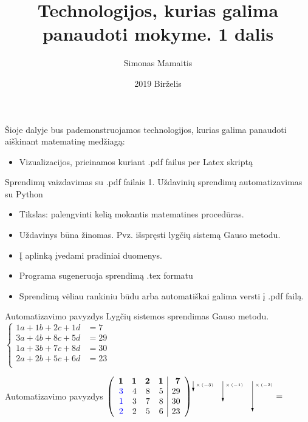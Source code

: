 \documentclass{beamer}
\title{Technologijos, kurias galima panaudoti mokyme. 1 dalis}
\author{Simonas Mamaitis}
\institute[VU]
{VU\\
}
\date{2019 Birželis}
\begin{document}
\begin{frame}
  \titlepage
\end{frame}

\begin{frame}
Šioje dalyje bus pademonstruojamos technologijos, kurias galima panaudoti aiškinant matematinę medžiagą:
\begin{itemize}
\item Vizualizacijos, prieinamos kuriant .pdf failus per Latex skriptą
\end{itemize}
\end{frame}

\begin{frame}[fragile]{Sprendimų vaizdavimas su .pdf failais}
1. Uždavinių sprendimų automatizavimas su Python
\begin{itemize}
\item Tikslas: palengvinti kelią mokantis matematines procedūras.
\item Uždavinys būna žinomas. Pvz. išspręsti lygčių sistemą Gauso metodu.
\item Į aplinką įvedami pradiniai duomenys.
\item Programa sugeneruoja sprendimą .tex formatu
\item Sprendimą vėliau rankiniu būdu arba automatiškai galima versti į .pdf failą.
\end{itemize}
\end{frame}

\begin{frame}[fragile]{Automatizavimo pavyzdys}
 Lygčių sistemos sprendimas Gauso metodu.
$\left\{\begin{array}{lr}
1a + 1b + 2c + 1d &=7\\
3a + 4b + 8c + 5d &=29\\
1a + 3b + 7c + 8d &=30\\
2a + 2b + 5c + 6d &=23\\
\end{array}\right.$
\end{frame}

\begin{frame}[fragile]{Automatizavimo pavyzdys}
\noindent$\left(\begin{array}{rrrr|r}
\bm{1} & \bm{1} & \bm{2} & \bm{1} & \bm{7}\\
\textcolor{blue}{3} & 4 & 8 & 5 & 29\\
\textcolor{blue}{1} & 3 & 7 & 8 & 30\\
\textcolor{blue}{2} & 2 & 5 & 6 & 23\\
\end{array}\right)
\setlength{\unitlength}{1pt}
\begin{picture} (95, 0)
\put(0.0, 21.0){\vector(0, -1){12}}
\put(3.0, 15.0){\tiny{$\times\left(-3\right)$}}
\put(35.0, 21.0){\vector(0, -1){24}}
\put(38.0, 15.0){\tiny{$\times\left(-1\right)$}}
\put(70.0, 21.0){\vector(0, -1){36}}
\put(73.0, 15.0){\tiny{$\times\left(-2\right)$}}
\end{picture}=$
\end{frame}
\end{document}
